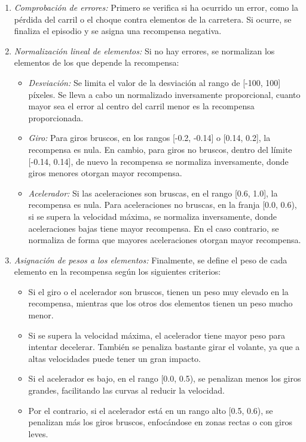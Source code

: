 \begin{enumerate}
\item \textit{Comprobación de errores:} Primero se verifica si ha ocurrido un error, como la pérdida del carril o el choque contra elementos de la carretera. Si ocurre, se finaliza el episodio y se asigna una recompensa negativa.
\item \textit{Normalización lineal de elementos:} Si no hay errores, se normalizan los elementos de los que depende la recompensa:
\begin{itemize}
\item \textit{Desviación:} Se limita el valor de la desviación al rango de [-100, 100] píxeles. Se lleva a cabo un normalizado inversamente proporcional, cuanto mayor sea el error al centro del carril menor es la recompensa proporcionada.
\item \textit{Giro:} Para giros bruscos, en los rangos [-0.2, -0.14] o [0.14, 0.2], la recompensa es nula. En cambio, para giros no bruscos, dentro del límite [-0.14, 0.14], de nuevo la recompensa se normaliza inversamente, donde giros menores otorgan mayor recompensa.
\item \textit{Acelerador:} Si las aceleraciones son bruscas, en el rango [0.6, 1.0], la recompensa es nula. Para aceleraciones no bruscas, en la franja [0.0, 0.6), si se supera la velocidad máxima, se normaliza inversamente, donde aceleraciones bajas tiene mayor recompensa. En el caso contrario, se normaliza de forma que mayores aceleraciones otorgan mayor recompensa.
\end{itemize}

\item \textit{Asignación de pesos a los elementos:} Finalmente, se define el peso de cada elemento en la recompensa según los siguientes criterios:
\begin{itemize}
\item Si el giro o el acelerador son bruscos, tienen un peso muy elevado en la recompensa, mientras que los otros dos elementos tienen un peso mucho menor.
\item Si se supera la velocidad máxima, el acelerador tiene mayor peso para intentar decelerar. También se penaliza bastante girar el volante, ya que a altas velocidades puede tener un gran impacto.
\item Si el acelerador es bajo, en el rango [0.0, 0.5), se penalizan menos los giros grandes, facilitando las curvas al reducir la velocidad.
\item Por el contrario, si el acelerador está en un rango alto [0.5, 0.6), se penalizan más los giros bruscos, enfocándose en zonas rectas o con giros leves.
\end{itemize}
\end{enumerate}

